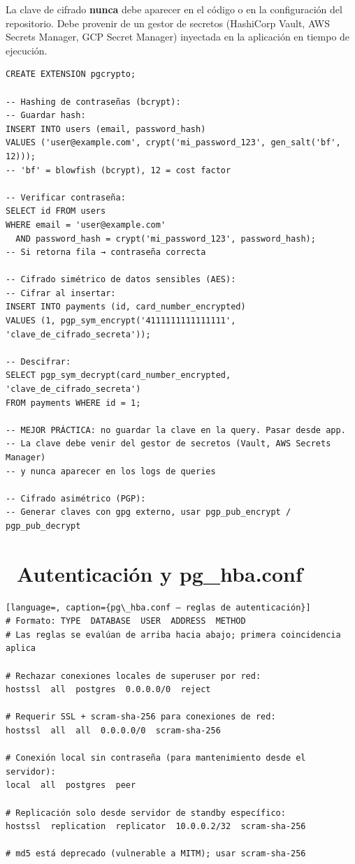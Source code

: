La clave de cifrado \textbf{nunca} debe aparecer en el código o en la configuración del repositorio.
Debe provenir de un gestor de secretos (HashiCorp Vault, AWS Secrets Manager, GCP Secret Manager) inyectada en la aplicación en tiempo de ejecución.

\begin{lstlisting}[caption={Cifrado simétrico y hashing con pgcrypto}]
CREATE EXTENSION pgcrypto;

-- Hashing de contraseñas (bcrypt):
-- Guardar hash:
INSERT INTO users (email, password_hash)
VALUES ('user@example.com', crypt('mi_password_123', gen_salt('bf', 12)));
-- 'bf' = blowfish (bcrypt), 12 = cost factor

-- Verificar contraseña:
SELECT id FROM users
WHERE email = 'user@example.com'
  AND password_hash = crypt('mi_password_123', password_hash);
-- Si retorna fila → contraseña correcta

-- Cifrado simétrico de datos sensibles (AES):
-- Cifrar al insertar:
INSERT INTO payments (id, card_number_encrypted)
VALUES (1, pgp_sym_encrypt('4111111111111111', 'clave_de_cifrado_secreta'));

-- Descifrar:
SELECT pgp_sym_decrypt(card_number_encrypted, 'clave_de_cifrado_secreta')
FROM payments WHERE id = 1;

-- MEJOR PRÁCTICA: no guardar la clave en la query. Pasar desde app.
-- La clave debe venir del gestor de secretos (Vault, AWS Secrets Manager)
-- y nunca aparecer en los logs de queries

-- Cifrado asimétrico (PGP):
-- Generar claves con gpg externo, usar pgp_pub_encrypt / pgp_pub_decrypt
\end{lstlisting}

\section[Autenticación y pg\_hba.conf]{~Autenticación y pg\_hba.conf}

\begin{lstlisting}[language=, caption={pg\_hba.conf — reglas de autenticación}]
# Formato: TYPE  DATABASE  USER  ADDRESS  METHOD
# Las reglas se evalúan de arriba hacia abajo; primera coincidencia aplica

# Rechazar conexiones locales de superuser por red:
hostssl  all  postgres  0.0.0.0/0  reject

# Requerir SSL + scram-sha-256 para conexiones de red:
hostssl  all  all  0.0.0.0/0  scram-sha-256

# Conexión local sin contraseña (para mantenimiento desde el servidor):
local  all  postgres  peer

# Replicación solo desde servidor de standby específico:
hostssl  replication  replicator  10.0.0.2/32  scram-sha-256

# md5 está deprecado (vulnerable a MITM); usar scram-sha-256
\end{lstlisting}


